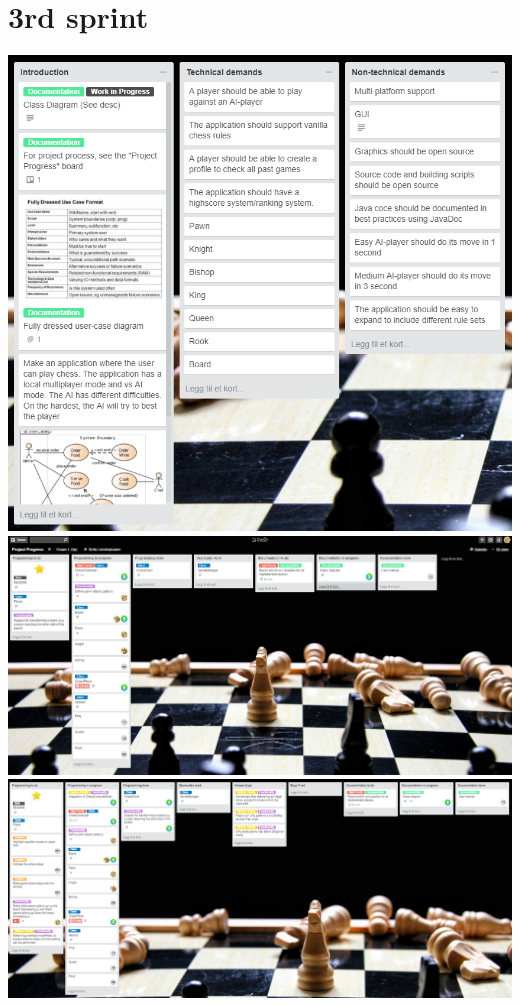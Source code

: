 \documentclass{article}
\begin{document}
\maketitle
\section*{3rd sprint}
\includegraphics[width=16cm]{main.png} \\
\newpage
\includegraphics[width=16cm]{sc1.png} \\
\includegraphics[width=16cm]{sc2.png} \\
\end{document}

